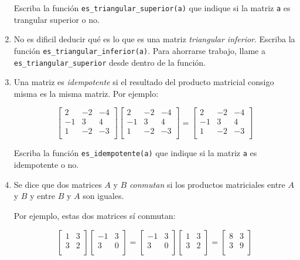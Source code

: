 \begin{enumerate}
  Escriba la función \lstinline!es_triangular_superior(a)! que indique
  si la matriz \lstinline!a! es trangular superior o no.

\item
  No es dificil deducir qué es lo que es una matriz \emph{triangular
  inferior}. Escriba la función \lstinline!es_triangular_inferior(a)!.
  Para ahorrarse trabajo, llame a \lstinline!es_triangular_superior!
  desde dentro de la función.

\item
  Una matriz es \emph{idempotente} si el resultado del producto
  matricial consigo misma es la misma matriz. Por ejemplo:

  \[\begin{bmatrix}
  2 & -2 & -4 \\
  -1 &  3 &  4 \\
  1 & -2 & -3 \\
  \end{bmatrix}
  \begin{bmatrix}
  2 & -2 & -4 \\
  -1 &  3 &  4 \\
  1 & -2 & -3 \\
  \end{bmatrix}
  =
  \begin{bmatrix}
  2 & -2 & -4 \\
  -1 &  3 &  4 \\
  1 & -2 & -3 \\
  \end{bmatrix}\]

  Escriba la función \lstinline!es_idempotente(a)! que indique si la
  matriz \lstinline!a! es idempotente o no.

\item
  Se dice que dos matrices \(A\) y \(B\) \emph{conmutan} si los
  productos matriciales entre \(A\) y \(B\) y entre \(B\) y
  \(A\) son iguales.

  Por ejemplo, estas dos matrices sí conmutan:

  \[\begin{bmatrix}
  1 & 3 \\ 3 & 2 \\
  \end{bmatrix}
  \begin{bmatrix}
  -1 & 3 \\ 3 & 0 \\
  \end{bmatrix} =
  \begin{bmatrix}
  -1 & 3 \\ 3 & 0 \\
  \end{bmatrix}
  \begin{bmatrix}
  1 & 3 \\ 3 & 2 \\
  \end{bmatrix} =
  \begin{bmatrix}
  8 & 3 \\ 3 & 9 \\
  \end{bmatrix}\]


\end{enumerate}

